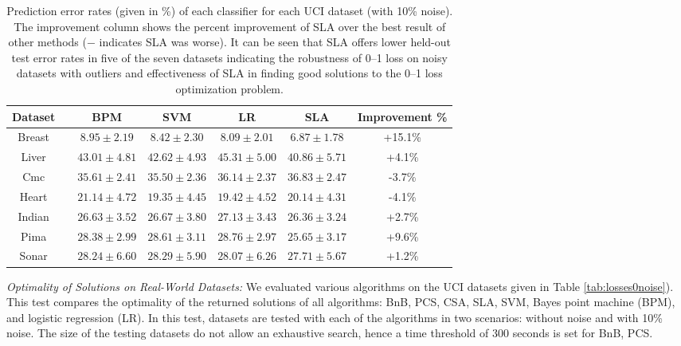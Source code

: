 \begin{table}[htbp!]
\centering
{\footnotesize 
\begin{tabular}{|cc|  ccc|c|c|}
\hline\hline
{\bf Dataset} && {\bf BPM} & {\bf SVM} & {\bf LR} & {\bf SLA} & {\bf Improvement \%}\\  
\hline
Breast && $8.95 \pm 2.19$ & $8.42 \pm 2.30$ & $8.09 \pm 2.01$ & $6.87 \pm 1.78$ & +15.1\%\\  
Liver && $43.01 \pm 4.81$ & $42.62 \pm 4.93$ & $45.31 \pm 5.00$ & $40.86 \pm 5.71$ & +4.1\%\\  
Cmc && $35.61 \pm 2.41$ & $35.50 \pm 2.36$ & $36.14 \pm 2.37$ & $36.83 \pm 2.47$ & -3.7\%\\  
Heart && $21.14 \pm 4.72$ & $19.35 \pm 4.45$ & $19.42 \pm 4.52$ & $20.14 \pm 4.31$ & -4.1\%\\  
Indian && $26.63 \pm 3.52$ & $26.67 \pm 3.80$ & $27.13 \pm 3.43$ & $26.36 \pm 3.24$ & +2.7\%\\  
Pima && $28.38 \pm 2.99$ & $28.61 \pm 3.11$ & $28.76 \pm 2.97$ & $25.65 \pm 3.17$ & +9.6\%\\  
Sonar && $28.24 \pm 6.60$ & $28.29 \pm 5.90$ & $28.07 \pm 6.26$ & $27.71 \pm 5.67$ & +1.2\%\\  
\hline
\end{tabular}}
\caption{Prediction error rates (given in \%) of each classifier for
  each UCI dataset (with 10\% noise). The improvement column shows the
  percent improvement of SLA over the best result of other methods ($-$
  indicates SLA was worse). It can be seen that SLA offers lower held-out
  test error rates in five of the seven datasets indicating the robustness
  of 0--1 loss on noisy datasets with outliers and effectiveness of SLA
  in finding good solutions to the 0--1 loss optimization problem.}
\label{tab:ucierrorrates}
\end{table}

\noindent\emph{Optimality of Solutions on Real-World Datasets:} We
evaluated various algorithms on the UCI datasets given in Table
\ref{tab:losses0noise}). This test compares the optimality of the returned
solutions of all algorithms: BnB, PCS, CSA, SLA, SVM, Bayes point
machine (BPM), and logistic regression (LR). In this test, datasets
are tested with each of the algorithms in two scenarios: without noise
and with 10\% noise.  The size of the testing datasets do not allow an
exhaustive search, hence a time threshold of 300 seconds is set for
BnB, PCS.  

